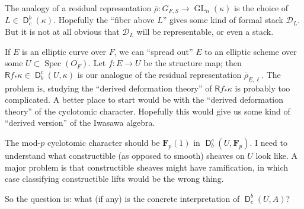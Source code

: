 \documentclass{article}
\DeclareMathOperator{\derive}{\mathsf{D}}
\DeclareMathOperator{\GL}{GL}
\DeclareMathOperator{\spec}{Spec}
\newcommand{\cD}{\mathcal{D}}
\newcommand{\dF}{\mathbf{F}}
\begin{document}
The analogy of a residual representation $\bar\rho:G_{F,S}\to \GL_n(\kappa)$ is 
the choice of $L\in \derive_c^b(\kappa)$. Hopefully the ``fiber above $L$'' 
gives some kind of formal stack $\cD_L$. But it is not at all obvious that 
$\cD_L$ will be representable, or even a stack. 

If $E$ is an elliptic curve over $F$, we can ``spread out'' $E$ to an elliptic 
scheme over some $U\subset \spec(O_F)$. Let $f:E\to U$ be the structure map; 
then $\mathsf R f_\ast \kappa\in \derive_b^c(U,\kappa)$ is our analogue of the 
residual representation $\bar\rho_{E,\ell}$. The problem is, studying the 
``derived deformation theory'' of $\mathsf Rf_\ast \kappa$ is probably too 
complicated. A better place to start would be with the ``derived deformation 
theory'' of the cyclotomic character. Hopefully this would give us some kind of 
``derived version'' of the Iwasawa algebra. 

The mod-$p$ cyclotomic character should be $\dF_p(1)$ in 
$\derive_b^c(U,\dF_p)$. I need to understand what constructible (as opposed to 
smooth) sheaves on $U$ look like. A major problem is that constructible sheaves 
might have ramification, in which case classifying constructible lifts would be 
the wrong thing. 

So the question is: what (if any) is the concrete interpretation of 
$\derive_c^b(U,A)$? 
\end{document}
